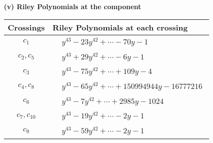 \documentclass[1p]{elsarticle_modified}
\theoremstyle{definition}
\begin{document}
\newpage\renewcommand{\arraystretch}{1}
\flushleft \textbf{(v) Riley Polynomials at the component}\newline \\
\begin{tabular}{m{50pt}|m{274pt}}
Crossings & \hspace{64pt}Riley Polynomials at each crossing \\
\hline $$\begin{aligned}c_{1}\end{aligned}$$&$\begin{aligned}
&y^{43}-23 y^{42}+\cdots-70 y-1
\end{aligned}$\\
\hline $$\begin{aligned}c_{2},c_{5}\end{aligned}$$&$\begin{aligned}
&y^{43}+29 y^{42}+\cdots-6 y-1
\end{aligned}$\\
\hline $$\begin{aligned}c_{3}\end{aligned}$$&$\begin{aligned}
&y^{43}-75 y^{42}+\cdots+109 y-4
\end{aligned}$\\
\hline $$\begin{aligned}c_{4},c_{8}\end{aligned}$$&$\begin{aligned}
&y^{43}-65 y^{42}+\cdots+150994944 y-16777216
\end{aligned}$\\
\hline $$\begin{aligned}c_{6}\end{aligned}$$&$\begin{aligned}
&y^{43}-7 y^{42}+\cdots+2985 y-1024
\end{aligned}$\\
\hline $$\begin{aligned}c_{7},c_{10}\end{aligned}$$&$\begin{aligned}
&y^{43}-19 y^{42}+\cdots-2 y-1
\end{aligned}$\\
\hline $$\begin{aligned}c_{9}\end{aligned}$$&$\begin{aligned}
&y^{43}-59 y^{42}+\cdots-2 y-1
\end{aligned}$\\

\end{tabular}
\end{document}
